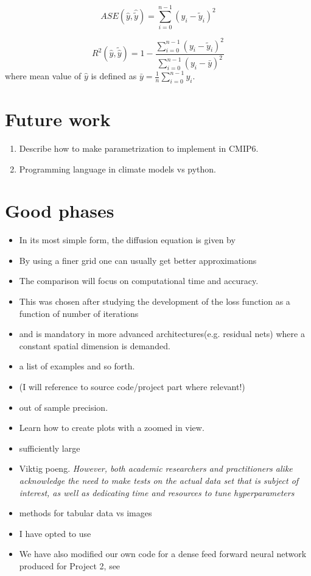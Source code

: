 \begin{equation} \label{eq:ase}
    ASE(\hat{y},\hat{\tilde{y}}) =  \sum_{i=0}^{n-1}(y_i-\tilde{y}_i)^2
\end{equation} 

\begin{equation} \label{eq:r2}
    R^2(\hat{y}, \tilde{\hat{y}}) = 1 - \frac{\sum_{i=0}^{n - 1} (y_i - \tilde{y}_i)^2}{\sum_{i=0}^{n - 1} (y_i - \bar{y})^2}
\end{equation} 
where mean value of $\hat{y}$ is defined as $\bar{y} =  \frac{1}{n} \sum_{i=0}^{n - 1} y_i$. 

\section{Future work}
\begin{enumerate}
    \item Describe how to make parametrization to implement in CMIP6.
    \item Programming language in climate models vs python.
\end{enumerate}

\section{Good phases}
\begin{itemize}
    \item  In its most simple form, the diffusion equation is given by
    \item By using a finer grid one can usually get better approximations
    \item The comparison will focus on computational time and accuracy.
    \item This was chosen after
studying the development of the loss function as a function of number of iterations
    \item and is mandatory in
more advanced architectures(e.g. residual nets) where a constant spatial
dimension is demanded.
    \item a list of examples and so forth.
    \item (I will reference to source code/project part where relevant!)
    \item out of sample precision.
    \item Learn how to create plots with a zoomed in view.
    \item sufficiently large
    \item Viktig poeng. \textit{However, both academic
researchers and practitioners alike acknowledge the
need to make tests on the actual data set that is
subject of interest, as well as dedicating time and
resources to tune hyperparameters}
    \item methods for tabular data vs images
    \item I have opted to use
    \item We have also modified our own code for a dense feed forward neural
network produced for Project 2, see

\end{itemize}





